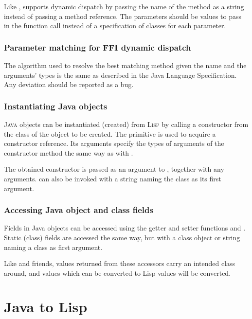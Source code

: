 \documentclass[10pt]{book}
\begin{document}
Like ,  supports dynamic dispatch by
passing the name of the method as a string instead of passing a method reference.
The parameters should be values to pass in the function call instead of
a specification of classes for each parameter.

\subsubsection{Parameter matching for FFI dynamic dispatch}
\label{section:param-matching-for-ffi}

The algorithm used to resolve the best matching method given the name
and the arguments' types is the same as described in the Java Language
Specification. Any deviation should be reported as a bug.


\subsubsection{Instantiating Java objects}

\textsc{Java} objects can be instantiated (created) from \textsc{Lisp} by calling
a constructor from the class of the object to be created. The
 primitive is used to acquire a constructor
reference. Its arguments specify the types of arguments of the constructor
method the same way as with .

The obtained constructor is passed as an argument to ,
together with any arguments.   can also be invoked with
a string naming the class as its first argument.

\subsubsection{Accessing Java object and class fields}

Fields in Java objects can be accessed using the getter and setter
functions  and .  Static
(class) fields are accessed the same way, but with a class object or
string naming a class as first argument.

Like  and friends, values returned from these accessors carry
an intended class around, and values which can be converted to Lisp values will
be converted.

\section{Java to Lisp}
\end{document}
